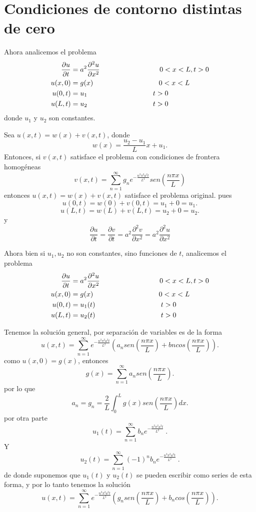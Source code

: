 \documentclass[11pt]{book}
\theoremstyle{plain}
\theoremstyle{definition}
\begin{document}
\section{Condiciones de contorno distintas de cero}
Ahora analicemos el problema
\setcounter{equation}{0}
\begin{align}
    \frac{\partial u}{\partial t} &= a^{2} \frac{\partial^2 u}{\partial x^2} \hspace{30mm} 0<x<L, t > 0\\ 
    u(x,0)&= g(x) \hspace{33mm} 0<x<L\\
    u(0,t)&= u_{1} \hspace{33mm} t>0\\
    u(L,t)&= u_{2} \hspace{33mm} t>0
\end{align}
donde $u_{1}$ y $u_{2}$ son constantes.

Sea $u(x,t) = w(x) + v(x,t)$, donde
\[
    w(x) = \frac{u_{2}-u_{1}}{L}x + u_{1}
.\]
Entonces, si $v(x,t)$ satisface el problema con condiciones de frontera homogéneas
\[
    v(x,t) = \sum_{n=1}^{\infty} g_{n}e^{-\frac{n^{2}\pi^{2}a^{2}t}{L^{2}}}sen(\frac{n\pi x}{L})
\]
entonces $u(x,t) = w(x) + v(x,t)$ satisface el problema original. pues
\[
    u(0,t) = w(0) + v(0,t) = u_{1} + 0 = u_{1}
.\]
\[
    u(L,t) = w(L) + v(L,t) = u_{2} + 0 = u_{2}
.\]
y 
\[
    \frac{\partial u}{\partial t} = \frac{\partial v}{\partial t} = a^{2} \frac{\partial^2 v}{\partial x^2} = a^{2} \frac{\partial^2 u}{\partial x^2}
\]

Ahora bien si $u_{1}, u_{2}$ no son constantes, sino funciones de $t$,
analicemos el problema
\setcounter{equation}{0}
\begin{align}
    \frac{\partial u}{\partial t} &= a^{2} \frac{\partial^2 u}{\partial x^2} \hspace{30mm} 0<x<L, t > 0\\ 
    u(x,0)&= g(x) \hspace{33mm} 0<x<L\\
    u(0,t)&= u_{1}(t) \hspace{33mm} t>0\\
    u(L,t)&= u_{2}(t) \hspace{33mm} t>0
\end{align}

Tenemos la solución general, por separación de variables es de la forma
\[
    u(x,t) = \sum_{n=1}^{\infty} e^{-\frac{n^{2}\pi^{2}a^{2}t}{L^{2}}}\left(a_n sen(\frac{n\pi x}{L}) + bn cos(\frac{n\pi x}{L})\right)
.\]
como $u(x,0) = g(x)$, entonces
\[
    g(x) = \sum_{n=1}^{\infty} a_n sen(\frac{n\pi x}{L})
.\]
por lo que
\[
    a_n = g_{n} =\frac{2}{L}\int_{0}^{L} g(x) sen(\frac{n\pi x}{L})dx
.\]
por otra parte
\[
    u_{1}(t) = \sum_{n=1}^{\infty} b_n e^{-\frac{n^{2}\pi^{2}a^{2}t}{L^{2}}}\
.\]
Y
\[
    u_{2}(t) = \sum_{n=1}^{\infty} (-1)^{n} b_n e^{-\frac{n^{2}\pi^{2}a^{2}t}{L^{2}}}\
.\]
de donde suponemos que $u_{1}(t)$ y $u_{2}(t)$ se pueden escribir como series de esta forma, y por lo tanto tenemos la solución
\[
    u(x,t) = \sum_{n=1}^{\infty} e^{-\frac{n^{2}\pi^{2}a^{2}t}{L^{2}}}\left(g_n sen(\frac{n\pi x}{L}) + b_n cos(\frac{n\pi x}{L})\right)
.\]
\end{document}
